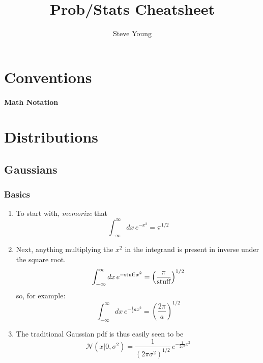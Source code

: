 \documentclass[11pt]{article}
\title{Prob/Stats Cheatsheet}
\author{Steve Young}
\begin{document}
\maketitle

\section{Conventions}
\paragraph{Math Notation}



\section{Distributions}
\subsection{Gaussians}
\subsubsection{Basics}
\begin{enumerate}
  \item To start with, \emph{memorize} that
  \begin{equation}
    \boxed{\int_{-\infty}^{\infty} dx\, e^{-x^2} = \pi^{1/2}}
  \end{equation}

  \item Next, anything multiplying the $x^2$ in the integrand is present in inverse
  under the square root.
  \begin{equation}
    \int_{-\infty}^{\infty} dx\, e^{-\textrm{stuff}\, x^2} =
    \left(\frac{\pi}{\textrm{stuff}}\right)^{1/2}
  \end{equation}
  so, for example:
  \begin{equation}
    \label{eq:int_gauss_a2}
    \int_{-\infty}^{\infty} dx\, e^{-\frac{1}{2} a x^2} =
    \left( \frac{2 \pi}{a} \right)^{1/2} 
  \end{equation}

  \item The traditional Gaussian pdf is thus easily seen to be
  \begin{equation}
    \mathcal{N}(x|0,\sigma^2) = \frac{1}{\left( 2 \pi \sigma^2 \right)^{1/2}}\,
    e^{-\frac{1}{2 \sigma^2} x^2}
  \end{equation}
\end{enumerate}
\end{document}
